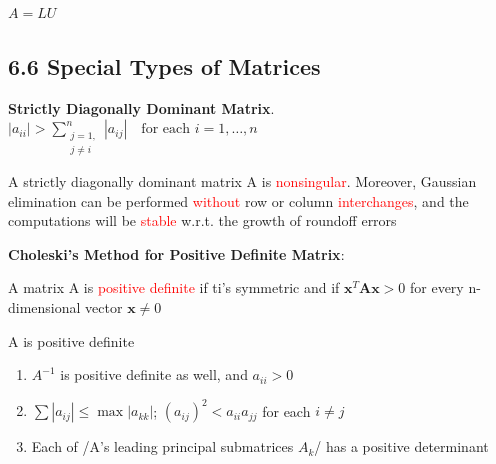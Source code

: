 \documentclass[11pt]{article}
\begin{document}
\(A=LU\)
\subsection{6.6 Special Types of Matrices}
\label{sec:org43f6c43}
\textbf{Strictly Diagonally Dominant Matrix}.
\(|a_{ii}|>\displaystyle\sum_{\substack{j=1,\\j\neq i}}^n|a_{ij}| \quad
   \text{for each } i=1,\dots,n\)

\begin{theorem}
A strictly diagonally dominant matrix A is \textcolor{red}{nonsingular}. Moreover,
Gaussian elimination can be performed \textcolor{red}{without} row or column
\textcolor{red}{interchanges}, and the computations will be \textcolor{red}{stable}
w.r.t. the growth of roundoff errors
\end{theorem}

\textbf{Choleski's Method for Positive Definite Matrix}:
\begin{definition}
A matrix A is \textcolor{red}{positive definite} if ti's symmetric and if    
$ \mathbf{x}^T \mathbf{A} \mathbf{x}>0$ for every n-dimensional vector $ \mathbf{x}\neq 0$
\end{definition}

\begin{lemma}
A is positive definite
\begin{enumerate}
\item $A^{-1}$ is positive definite as well, and $a_{ii}>0$
\item $\sum|a_{ij}|\le\max|a_{kk}|$; $(a_{ij})^2<a_{ii}a_{jj}$ for each $i\neq j$
\item Each of /A's leading principal submatrices $A_k$/ has a positive determinant
\end{enumerate}
\end{lemma}
\end{document}
